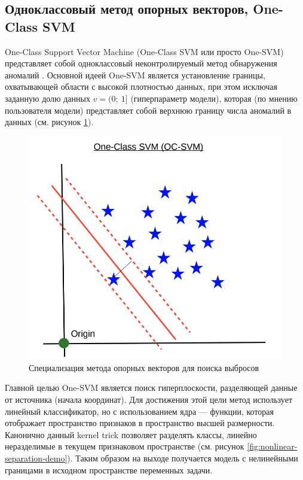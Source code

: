 \subsection{Одноклассовый метод опорных векторов, One-Class SVM}

One-Class Support Vector Machine (One-Class SVM или просто One-SVM) представляет собой одноклассовый неконтролируемый метод обнаружения аномалий \cite{Skilear-One-Class-SVM-Doc}. Основной идеей One-SVM является установление границы, охватывающей области с высокой плотностью данных, при этом исключая заданную долю данных $v = (0;\ 1]$ (гиперпараметр модели), которая (по мнению пользователя модели) представляет собой верхнюю границу числа аномалий в данных (см. рисунок \ref{fig:one-class-svm}).

\begin{figure}
  \centering
  \includegraphics[scale=0.5]{inc/images/one-class-svm.png}
  \caption{Специализация метода опорных векторов для поиска выбросов \cite{SVM-Lecture}}
  \label{fig:one-class-svm}
\end{figure}

Главной целью One-SVM является поиск гиперплоскости, разделяющей данные от источника (начала координат). Для достижения этой цели метод использует линейный классификатор, но с использованием ядра --- функции, которая отображает пространство признаков в пространство высшей размерности. Канонично данный kernel trick \cite{Anomaly-Detection-One-Class-SVM} позволяет разделять классы, линейно неразделимые в текущем признаковом пространстве (см. рисунок \ref{fig:nonlinear-separation-demo}). Таким образом на выходе получается модель с нелинейными границами в исходном пространстве переменных задачи.


